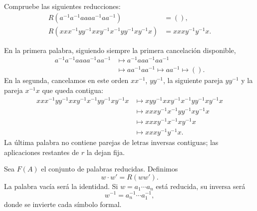 \begin{ejer}\label{ejer:C3-reducciones}
Compruebe las siguientes reducciones:
\[
\begin{aligned}
R(a^{-1}a^{-1}aaaa^{-1}aa^{-1})&=(),\\
R(xxx^{-1}yy^{-1}xxy^{-1}x^{-1}yy^{-1}xy^{-1}x)
&=xxxy^{-1}y^{-1}x.
\end{aligned}
\]
\end{ejer}
\begin{sol}
En la primera palabra, siguiendo siempre la primera cancelación disponible,
\[
\begin{aligned}
a^{-1}a^{-1}aaaa^{-1}aa^{-1}
&\longmapsto a^{-1}aaa^{-1}aa^{-1}\\
&\longmapsto aa^{-1}aa^{-1}
\longmapsto aa^{-1}\longmapsto().
\end{aligned}
\]
En la segunda, cancelamos en este orden $xx^{-1}$, $yy^{-1}$, la siguiente pareja $yy^{-1}$ y la pareja $x^{-1}x$ que queda contigua:
\[
\begin{aligned}
xxx^{-1}yy^{-1}xxy^{-1}x^{-1}yy^{-1}xy^{-1}x
&\longmapsto xyy^{-1}xxy^{-1}x^{-1}yy^{-1}xy^{-1}x\\
&\longmapsto xxxy^{-1}x^{-1}yy^{-1}xy^{-1}x\\
&\longmapsto xxxy^{-1}x^{-1}xy^{-1}x\\
&\longmapsto xxxy^{-1}y^{-1}x.
\end{aligned}
\]
La última palabra no contiene parejas de letras inversas contiguas; las aplicaciones restantes de $r$ la dejan fija.
\end{sol}

Sea $F(A)$ el conjunto de palabras reducidas. Definimos
\[
w\cdot w'=R(ww').
\]
La palabra vacía será la identidad. Si $w=a_1\cdots a_n$ está reducida, su inversa será
\[
w^{-1}=a_n^{-1}\cdots a_1^{-1},
\]
donde se invierte cada símbolo formal.

